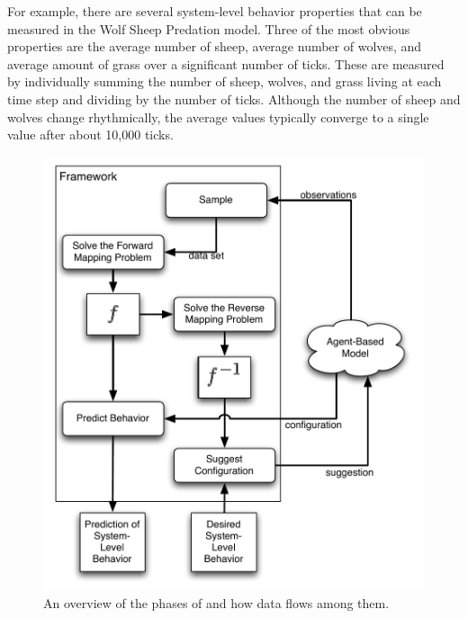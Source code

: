 For example, there are several system-level behavior properties that can be measured in the Wolf Sheep Predation model.
Three of the most obvious properties are the average number of sheep, average number of wolves, and average amount of grass over a significant number of ticks.
These are measured by individually summing the number of sheep, wolves, and grass living at each time step and dividing by the number of ticks.
Although the number of sheep and wolves change rhythmically, the average values typically converge to a single value after about 10,000 ticks.


\begin{figure}[H]
\centering
\includegraphics[scale=1]{images/framework.pdf}
\caption{An overview of the phases of \fw and how data flows among them.}
\label{fig:frameworkdiag}
\end{figure}



